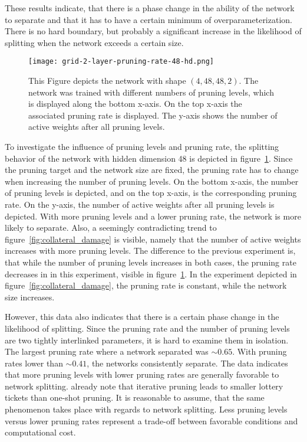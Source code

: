 These results indicate, that there is a phase change in the ability of the network to separate and that it has to have a certain minimum of overparameterization.
There is no hard boundary, but probably a significant increase in the likelihood of splitting when the network exceeds a certain size.

\begin{figure}[ht]
    \centering
    \texttt{[image: grid-2-layer-pruning-rate-48-hd.png]}
    \caption{This Figure depicts the network with shape $(4,48,48,2)$.
    The network was trained with different numbers of pruning levels, which is displayed along the bottom x-axis.
    On the top x-axis the associated pruning rate is displayed.
    The y-axis shows the number of active weights after all pruning levels.
    }\label{fig:grid-2}
\end{figure}

To investigate the influence of pruning levels and pruning rate, the splitting behavior of the network with hidden dimension 48 is depicted in figure~\ref{fig:grid-2}.
Since the pruning target and the network size are fixed, the pruning rate has to change when increasing the number of pruning levels.
On the bottom x-axis, the number of pruning levels is depicted, and on the top x-axis, is the corresponding pruning rate.
On the y-axis, the number of active weights after all pruning levels is depicted.
With more pruning levels and a lower pruning rate, the network is more likely to separate.
Also, a seemingly contradicting trend to figure~\ref{fig:collateral_damage} is visible, namely that the number of active weights increases with more pruning levels.
The difference to the previous experiment is, that while the number of pruning levels increases in both cases, the pruning rate decreases in in this experiment, visible in figure~\ref{fig:grid-2}. In the experiment depicted in figure~\ref{fig:collateral_damage}, the pruning rate is constant, while the network size increases.

However, this data also indicates that there is a certain phase change in the likelihood of splitting.
Since the pruning rate and the number of pruning levels are two tightly interlinked parameters, it is hard to examine them in isolation.
The largest pruning rate where a network separated was $\sim0.65$. 
With pruning rates lower than $\sim0.41$, the networks consistently separate.
The data indicates that more pruning levels with lower pruning rates are generally favorable to network splitting.
\textcite{LTH} already note that iterative pruning leads to smaller lottery tickets than one-shot pruning.
It is reasonable to assume, that the same phenomenon takes place with regards to network splitting.
Less pruning levels versus lower pruning rates represent a trade-off between favorable conditions and computational cost.

